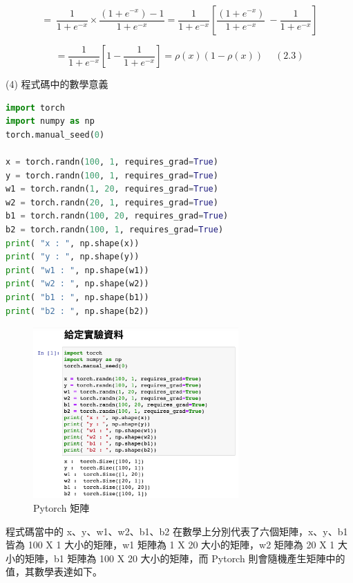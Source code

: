 \documentclass[11pt,UTF8]{ctexart}
\begin{document}
$$=\ \frac{1}{1+e^{-x}}\times\frac{(1+e^{-x})-1}{1+e^{-x}}=\frac{1}{1+e^{-x}}\left[\frac{(1+e^{-x})}{1+e^{-x}}\ -\frac{1}{1+e^{-x}}\right]$$

$$=\frac{1}{1+e^{-x}}\left[1-\frac{1}{1+e^{-x}}\right]=\rho(x)(1-\rho(x))  \quad \ (2.3)$$


(4) 程式碼中的數學意義

	\begin{lstlisting}[language={python}]
import torch
import numpy as np
torch.manual_seed(0)

x = torch.randn(100, 1, requires_grad=True)
y = torch.randn(100, 1, requires_grad=True)
w1 = torch.randn(1, 20, requires_grad=True)
w2 = torch.randn(20, 1, requires_grad=True)
b1 = torch.randn(100, 20, requires_grad=True)
b2 = torch.randn(100, 1, requires_grad=True)
print( "x : ", np.shape(x))
print( "y : ", np.shape(y))
print( "w1 : ", np.shape(w1))
print( "w2 : ", np.shape(w2))
print( "b1 : ", np.shape(b1))
print( "b2 : ", np.shape(b2))
	\end{lstlisting}

\begin{figure}[H]
\centering 
\includegraphics[width=0.7\textwidth]{mcp1.png} 
\caption{Pytorch 矩陣}
\label{Code.2}
\end{figure}

程式碼當中的 x、y、w1、w2、b1、b2 在數學上分別代表了六個矩陣，x、y、b1 皆為 100 X 1 大小的矩陣，w1 矩陣為 1 X 20 大小的矩陣，w2 矩陣為 20 X 1 大小的矩陣，b1 矩陣為 100 X 20 大小的矩陣，而 Pytorch 則會隨機產生矩陣中的值，其數學表達如下。
\end{document}
